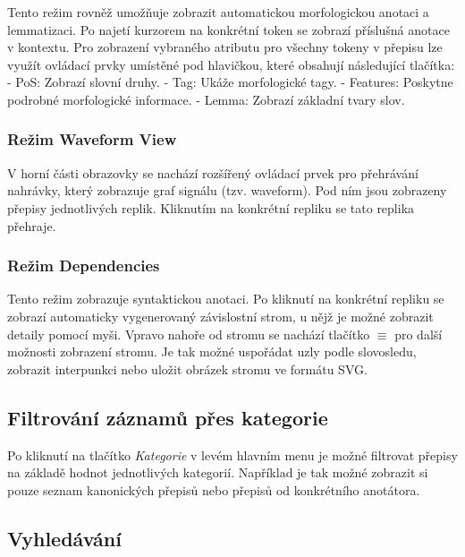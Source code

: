\documentclass[
]{article}
\begin{document}
Tento režim rovněž umožňuje zobrazit automatickou morfologickou anotaci
a lemmatizaci. Po najetí kurzorem na konkrétní token se zobrazí
příslušná anotace v kontextu. Pro zobrazení vybraného atributu pro
všechny tokeny v přepisu lze využít ovládací prvky umístěné pod
hlavičkou, které obsahují následující tlačítka: - PoS: Zobrazí slovní
druhy. - Tag: Ukáže morfologické tagy. - Features: Poskytne podrobné
morfologické informace. - Lemma: Zobrazí základní tvary slov.

\hypertarget{reux17eim-waveform-view}{%
\subsubsection{Režim Waveform View}\label{reux17eim-waveform-view}}

V horní části obrazovky se nachází rozšířený ovládací prvek pro
přehrávání nahrávky, který zobrazuje graf signálu (tzv. waveform). Pod
ním jsou zobrazeny přepisy jednotlivých replik. Kliknutím na konkrétní
repliku se tato replika přehraje.

\hypertarget{reux17eim-dependencies}{%
\subsubsection{Režim Dependencies}\label{reux17eim-dependencies}}

Tento režim zobrazuje syntaktickou anotaci. Po kliknutí na konkrétní
repliku se zobrazí automaticky vygenerovaný závislostní strom, u nějž je
možné zobrazit detaily pomocí myši. Vpravo nahoře od stromu se nachází
tlačítko $\equiv$ pro další možnosti zobrazení stromu. Je tak možné uspořádat
uzly podle slovosledu, zobrazit interpunkci nebo uložit obrázek stromu
ve formátu SVG.

\hypertarget{filtrovuxe1nuxed-zuxe1znamux16f-pux159es-kategorie}{%
\subsection{Filtrování záznamů přes
kategorie}\label{filtrovuxe1nuxed-zuxe1znamux16f-pux159es-kategorie}}

Po kliknutí na tlačítko \emph{Kategorie} v levém hlavním menu je možné
filtrovat přepisy na základě hodnot jednotlivých kategorií. Například je
tak možné zobrazit si pouze seznam kanonických přepisů nebo přepisů od
konkrétního anotátora.

\hypertarget{vyhleduxe1vuxe1nuxed}{%
\subsection{Vyhledávání}\label{vyhleduxe1vuxe1nuxed}}
\end{document}
